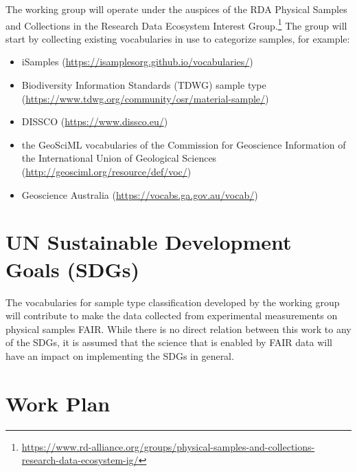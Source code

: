 \documentclass{scrartcl}
\begin{document}
The working group will operate under the auspices of the RDA Physical
Samples and Collections in the Research Data Ecosystem Interest
Group.\footnote{\url{https://www.rd-alliance.org/groups/physical-samples-and-collections-research-data-ecosystem-ig/}}
The group will start by collecting existing vocabularies in use to
categorize samples, for example:
\begin{itemize}
\item iSamples (\url{https://isamplesorg.github.io/vocabularies/})
\item Biodiversity Information Standards (TDWG) sample type
  (\url{https://www.tdwg.org/community/osr/material-sample/})
\item DISSCO (\url{https://www.dissco.eu/})
\item the GeoSciML vocabularies of the Commission for Geoscience
  Information of the International Union of Geological Sciences
  (\url{http://geosciml.org/resource/def/voc/})
\item Geoscience Australia (\url{https://vocabs.ga.gov.au/vocab/})
\end{itemize}

\section{UN Sustainable Development Goals (SDGs)}

The vocabularies for sample type classification developed by the
working group will contribute to make the data collected from
experimental measurements on physical samples FAIR.  While there is no
direct relation between this work to any of the SDGs, it is assumed
that the science that is enabled by FAIR data will have an impact on
implementing the SDGs in general.

\section{Work Plan}
\end{document}

